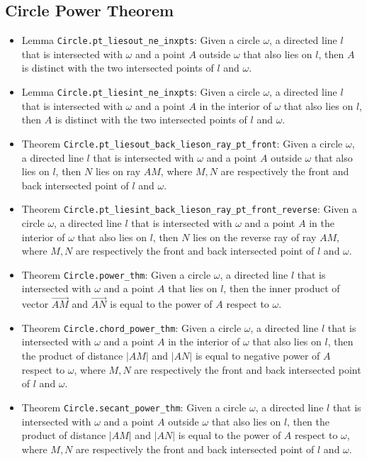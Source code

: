 \documentclass[12pt]{amsart}
\begin{document}
\subsection{Circle Power Theorem}
\begin{itemize}
    \item Lemma \verb|Circle.pt_liesout_ne_inxpts|: Given a circle $\omega$, a directed line $l$ that is intersected with $\omega$ and a point $A$ outside $\omega$ that also lies on $l$, then $A$ is distinct with the two intersected points of $l$ and $\omega$.
    \item Lemma \verb|Circle.pt_liesint_ne_inxpts|: Given a circle $\omega$, a directed line $l$ that is intersected with $\omega$ and a point $A$ in the interior of $\omega$ that also lies on $l$, then $A$ is distinct with the two intersected points of $l$ and $\omega$.
    \item Theorem \verb|Circle.pt_liesout_back_lieson_ray_pt_front|: Given a circle $\omega$, a directed line $l$ that is intersected with $\omega$ and a point $A$ outside $\omega$ that also lies on $l$, then $N$ lies on ray $AM$, where $M,N$ are respectively the front and back intersected point of $l$ and $\omega$.
    \item Theorem \verb|Circle.pt_liesint_back_lieson_ray_pt_front_reverse|: Given a circle $\omega$, a directed line $l$ that is intersected with $\omega$ and a point $A$ in the interior of $\omega$ that also lies on $l$, then $N$ lies on the reverse ray of ray $AM$, where $M,N$ are respectively the front and back intersected point of $l$ and $\omega$.
    \item Theorem \verb|Circle.power_thm|: Given a circle $\omega$, a directed line $l$ that is intersected with $\omega$ and a point $A$ that lies on $l$, then the inner product of vector $\overrightarrow{AM}$ and $\overrightarrow{AN}$ is equal to the power of $A$ respect to $\omega$.
    \item Theorem \verb|Circle.chord_power_thm|: Given a circle $\omega$, a directed line $l$ that is intersected with $\omega$ and a point $A$ in the interior of $\omega$ that also lies on $l$, then the product of distance $|AM|$ and $|AN|$ is equal to negative power of $A$ respect to $\omega$, where $M,N$ are respectively the front and back intersected point of $l$ and $\omega$.
    \item Theorem \verb|Circle.secant_power_thm|: Given a circle $\omega$, a directed line $l$ that is intersected with $\omega$ and a point $A$ outside $\omega$ that also lies on $l$, then the product of distance $|AM|$ and $|AN|$ is equal to the power of $A$ respect to $\omega$, where $M,N$ are respectively the front and back intersected point of $l$ and $\omega$.

\end{itemize}
\end{document}

